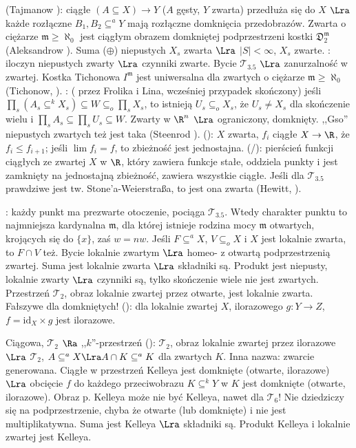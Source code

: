  (Tajmanow ): ciągłe   $(A \subseteq X) \to Y$ ($A$ gęsty, $Y$ zwarta) przedłuża się do $X$ $\Lra$ każde rozłączne $B_1, B_2 \subseteq^a Y$ mają rozłączne domknięcia przedobrazów.
Zwarta o ciężarze $\mathfrak m \ge \aleph_0$ jest ciągłym obrazem domkniętej podprzestrzeni kostki $\mathfrak D_2^{\mathfrak m}$ (Aleksandrow ).
Suma ($\oplus$) niepustych $X_s$ zwarta $\Lra$ $|S| < \infty$, $X_s$ zwarte.
: iloczyn niepustych zwarty $\Lra$ czynniki zwarte.
Bycie $\mathcal T_{3.5}$ $\Lra$ zanurzalność w zwartej.
Kostka Tichonowa $I^{\mathfrak m}$ jest uniwersalna dla zwartych o ciężarze $\mathfrak m \ge \aleph_0$ (Tichonow, ).
: ( przez Frolika i Lina, wcześniej przypadek skończony) jeśli $\prod_s (A_s \subseteq^k X_s) \subseteq W \subseteq_o \prod_s X_s$, to istnieją $U_s \subseteq_o X_s$, że $U_s \neq X_s$ dla skończenie wielu i $\prod_s A_s \subseteq \prod_s U_s \subseteq W$.
Zwarty w $\R^n$ $\Lra$ ograniczony, domknięty.
,,Gso'' niepustych zwartych też jest taka (Steenrod ). %
 (): $X$ zwarta, $f_i$ ciągłe $X \to \R$, że $f_i \le f_{i+1}$; jeśli $\lim f_i = f$, to zbieżność jest jednostajna.
 (/): pierścień funkcji ciągłych ze zwartej $X$ w $\R$, który zawiera funkcje stałe, oddziela punkty i jest zamknięty na jednostajną zbieżność, zawiera wszystkie ciągłe. 
Jeśli dla $\mathcal T_{3.5}$ prawdziwe jest tw. Stone'a-Weierstraßa, to jest ona zwarta (Hewitt, ).

:  każdy punkt ma prezwarte otoczenie, pociąga $\mathcal T_{3.5}$.
Wtedy charakter punktu to najmniejsza kardynalna $\mathfrak m$, dla której istnieje rodzina mocy $\mathfrak m$ otwartych, krojących się do $\{x\}$, zaś $w = nw$.
Jeśli $F \subseteq^a X$, $V \subseteq_o X$ i $X$ jest lokalnie zwarta, to $F \cap V$ też.
Bycie lokalnie zwartym $\Lra$ homeo- z otwartą podprzestrzenią zwartej.
Suma jest lokalnie zwarta $\Lra$ składniki są.
Produkt jest niepusty, lokalnie zwarty $\Lra$ czynniki są, tylko skończenie wiele nie jest zwartych.
Przestrzeń $\mathcal T_2$, obraz lokalnie zwartej przez otwarte, jest lokalnie zwarta. 
Fałszywe dla domkniętych!
 (): dla lokalnie zwartej $X$, ilorazowego $g \colon Y \to Z$, $f = \textrm{id}_X \times g$ jest ilorazowe.

Ciągowa, $\mathcal T_2$ $\Ra$ {,,$k$''-przestrzeń} (): $\mathcal T_2$, obraz lokalnie zwartej przez ilorazowe $\Lra$ $\mathcal T_2$, $A \subseteq^a X \Lra A \cap K \subseteq^a K$ dla zwartych $K$.
Inna nazwa: zwarcie generowana.
Ciągłe w przestrzeń Kelleya jest domknięte (otwarte, ilorazowe) $\Lra$ obcięcie $f$ do każdego przeciwobrazu $K \subseteq^k Y$ w $K$ jest domknięte (otwarte, ilorazowe).
Obraz p. Kelleya może nie być Kelleya, nawet dla $\mathcal T_6$!
Nie dziedziczy się na podprzestrzenie, chyba że otwarte (lub domknięte) i nie jest multiplikatywna.
Suma jest Kelleya $\Lra$ składniki są.
Produkt Kelleya i lokalnie zwartej jest Kelleya.

